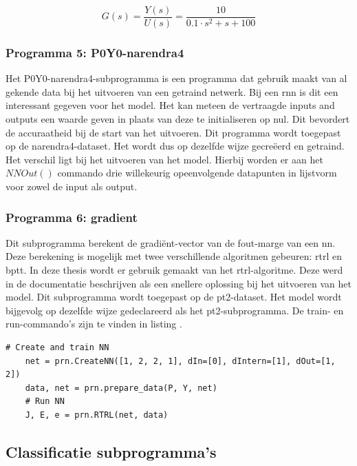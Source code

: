 		\begin{equation}\label{eq:pt2}
			G(s)= \frac{Y(s)}{U(s)} = \frac{10}{0.1 \cdot s^2 + s + 100}	
		\end{equation}
		
		\subsubsection{Programma 5: P0Y0-narendra4}
		Het P0Y0-narendra4-subprogramma is een programma dat gebruik maakt van al gekende data bij het uitvoeren van een getraind netwerk. Bij een \gls{rnn} is dit een interessant gegeven voor het model. Het kan meteen de vertraagde inputs and outputs een waarde geven in plaats van deze te initialiseren op nul. Dit bevordert de accuraatheid bij de start van het uitvoeren. Dit programma wordt toegepast op de narendra4-dataset. Het wordt dus op dezelfde wijze gecre\"eerd en getraind. Het verschil ligt bij het uitvoeren van het model. Hierbij worden er aan het $NNOut()$ commando drie willekeurig opeenvolgende datapunten in lijstvorm voor zowel de input als output. 

		\subsubsection{Programma 6: gradient}
		Dit subprogramma berekent de gradi\"ent-vector van de fout-marge van een \gls{nn}. Deze berekening is mogelijk met twee verschillende algoritmen gebeuren: \gls{rtrl} en \gls{bptt}. In deze thesis wordt er gebruik gemaakt van het \gls{rtrl}-algoritme. Deze werd in de documentatie beschrijven als een snellere oplossing bij het uitvoeren van het model. Dit subprogramma wordt toegepast op de pt2-dataset. Het model wordt bijgevolg op dezelfde wijze gedeclareerd als het pt2-subprogramma. De train- en run-commando's zijn te vinden in listing .

	\begin{lstlisting}[caption={Cre\"eren en trainen van pyrenn-model voor narendra4.}, captionpos=b,label={lst:narendra4}]
	# Create and train NN
	net = prn.CreateNN([1, 2, 2, 1], dIn=[0], dIntern=[1], dOut=[1, 2])
	data, net = prn.prepare_data(P, Y, net)
	# Run NN
	J, E, e = prn.RTRL(net, data)
	\end{lstlisting}
	

	\subsection{Classificatie subprogramma's}
		
